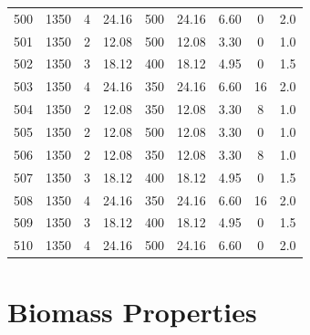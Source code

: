 \documentclass[11pt,twocolumn]{article}
\begin{document}
\begin{center}
\begin{tabular}{ccccccccc}
	500    &       1350 &             4 &     24.16 &       500 &       24.16 &               6.60 &            0 &         2.0 \\
	501    &       1350 &             2 &     12.08 &       500 &       12.08 &               3.30 &            0 &         1.0 \\
	502    &       1350 &             3 &     18.12 &       400 &       18.12 &               4.95 &            0 &         1.5 \\
	503    &       1350 &             4 &     24.16 &       350 &       24.16 &               6.60 &           16 &         2.0 \\
	504    &       1350 &             2 &     12.08 &       350 &       12.08 &               3.30 &            8 &         1.0 \\
	505    &       1350 &             2 &     12.08 &       500 &       12.08 &               3.30 &            0 &         1.0 \\
	506    &       1350 &             2 &     12.08 &       350 &       12.08 &               3.30 &            8 &         1.0 \\
	507    &       1350 &             3 &     18.12 &       400 &       18.12 &               4.95 &            0 &         1.5 \\
	508    &       1350 &             4 &     24.16 &       350 &       24.16 &               6.60 &           16 &         2.0 \\
	509    &       1350 &             3 &     18.12 &       400 &       18.12 &               4.95 &            0 &         1.5 \\
	510    &       1350 &             4 &     24.16 &       500 &       24.16 &               6.60 &            0 &         2.0 \\
\end{tabular}
\end{center}

\pagebreak

\section{Biomass Properties}
\label{app_bm}
\end{document}
